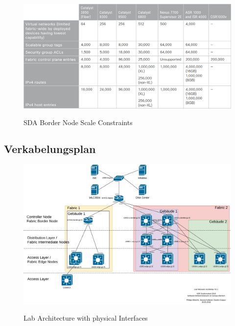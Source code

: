 \begin{figure}[H]
	\centering
	\includegraphics[width=1\linewidth]{img/MaximumScale-BorderNode.png}\\[1px]
	\caption{SDA Border Node Scale Constraints}
	\label{fig:SDA Border Node Scale Constraints}
\end{figure}

\pagebreak
\subsection{Verkabelungsplan}
\begin{figure}[H]
	\centering
	\includegraphics[angle=90,width=0.9\linewidth]{img/LabNetworkArchitecture-Interfaces.png}\\[1px]
	\caption{Lab Architecture with physical Interfaces}
	\label{fig:Lab Architecture with physical Interfaces}
\end{figure}


